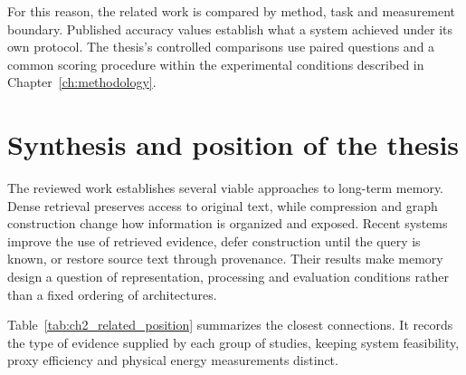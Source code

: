 For this reason, the related work is compared by method, task and measurement boundary.
Published accuracy values establish what a system achieved under its own protocol.
The thesis's controlled comparisons use paired questions and a common scoring procedure
within the experimental conditions described in Chapter~\ref{ch:methodology}.

\section{Synthesis and position of the thesis}
\label{sec:ch2_position}

The reviewed work establishes several viable approaches to long-term memory. Dense
retrieval preserves access to original text, while compression and graph construction
change how information is organized and exposed. Recent systems improve the use of
retrieved evidence, defer construction until the query is known, or restore source text
through provenance. Their results make memory design a question of representation,
processing and evaluation conditions rather than a fixed ordering of architectures.

Table~\ref{tab:ch2_related_position} summarizes the closest connections. It records the
type of evidence supplied by each group of studies, keeping system feasibility, proxy
efficiency and physical energy measurements distinct.

